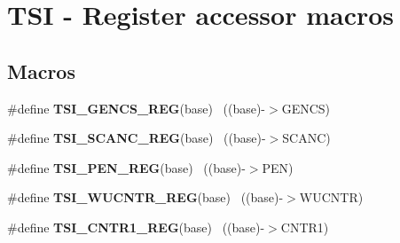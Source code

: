 \hypertarget{group___t_s_i___register___accessor___macros}{}\section{T\+S\+I -\/ Register accessor macros}
\label{group___t_s_i___register___accessor___macros}
\subsection*{Macros}
\begin{DoxyCompactItemize}
\item 
\hypertarget{group___t_s_i___register___accessor___macros_gacb2292491464fa55b36996380b09077f}{}\#define {\bfseries T\+S\+I\+\_\+\+G\+E\+N\+C\+S\+\_\+\+R\+E\+G}(base)                                        ~((base)-\/$>$G\+E\+N\+C\+S)\label{group___t_s_i___register___accessor___macros_gacb2292491464fa55b36996380b09077f}

\item 
\hypertarget{group___t_s_i___register___accessor___macros_gaa04f34529d4fc762bc30470edc1d5f38}{}\#define {\bfseries T\+S\+I\+\_\+\+S\+C\+A\+N\+C\+\_\+\+R\+E\+G}(base)                                        ~((base)-\/$>$S\+C\+A\+N\+C)\label{group___t_s_i___register___accessor___macros_gaa04f34529d4fc762bc30470edc1d5f38}

\item 
\hypertarget{group___t_s_i___register___accessor___macros_gaf538119a9d15bb7ecc599ef0c8dccec8}{}\#define {\bfseries T\+S\+I\+\_\+\+P\+E\+N\+\_\+\+R\+E\+G}(base)                                            ~((base)-\/$>$P\+E\+N)\label{group___t_s_i___register___accessor___macros_gaf538119a9d15bb7ecc599ef0c8dccec8}

\item 
\hypertarget{group___t_s_i___register___accessor___macros_ga49c16fb23aea66326627e034f76787c8}{}\#define {\bfseries T\+S\+I\+\_\+\+W\+U\+C\+N\+T\+R\+\_\+\+R\+E\+G}(base)                                      ~((base)-\/$>$W\+U\+C\+N\+T\+R)\label{group___t_s_i___register___accessor___macros_ga49c16fb23aea66326627e034f76787c8}

\item 
\hypertarget{group___t_s_i___register___accessor___macros_ga7c64ae8bd21ec584c53351a1c55b6346}{}\#define {\bfseries T\+S\+I\+\_\+\+C\+N\+T\+R1\+\_\+\+R\+E\+G}(base)                                        ~((base)-\/$>$C\+N\+T\+R1)\label{group___t_s_i___register___accessor___macros_ga7c64ae8bd21ec584c53351a1c55b6346}


\end{DoxyCompactItemize}
